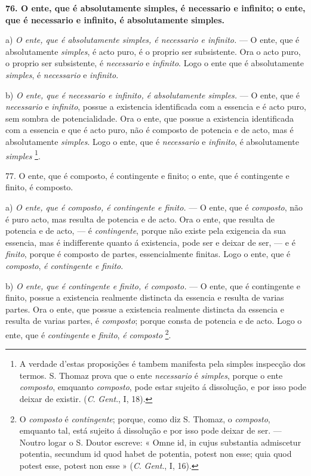 \textbf{76. O ente, que é absolutamente simples, é necessario e infinito; o ente, que é necessario e infinito, é absolutamente simples.}

a) \emph{O ente, que é absolutamente simples, é necessario e infinito.} --- O ente, que é absolutamente \emph{simples}, é acto puro, é o proprio ser subsistente. Ora o acto puro, o proprio ser subsistente, é \emph{necessario} e \emph{infinito}. Logo o ente que é absolutamente \emph{simples}, é \emph{necessario} e \emph{infinito}.

b) \emph{O ente, que é necessario e infinito, é absolutamente simples.} --- O ente, que é \emph{necessario} e \emph{infinito}, possue a existencia identificada com a essencia e é acto puro, sem sombra de potencialidade. Ora o ente, que possue a existencia identificada com a essencia e que é acto puro, não é composto de potencia e de acto, mas é absolutamente \emph{simples}. Logo o ente, que é \emph{necessario} e \emph{infinito}, é absolutamente \emph{simples} \footnote{A verdade d'estas proposições é tambem manifesta pela simples inspecção dos termos. S. Thomaz prova que o ente \emph{necessario} é \emph{simples}, porque o ente \emph{composto}, emquanto \emph{composto}, pode estar sujeito á dissolução, e por isso pode deixar de existir. (\emph{C}. \emph{Gent}., I, 18).}.

77. O ente, que é composto, é contingente e finito; o ente, que é contingente e finito, é composto.

a) \emph{O ente, que é composto, é contingente e finito.} --- O ente, que é \emph{composto}, não é puro acto, mas resulta de potencia e de acto. Ora o ente, que resulta de potencia e de acto, --- é \emph{contingente}, porque não existe pela exigencia da sua essencia, mas é indifferente quanto á existencia, pode ser e deixar de ser, --- e é \emph{finito}, porque é composto de partes, essencialmente finitas. Logo o ente, que é \emph{composto}, \emph{é contingente e finito}.

b) \emph{O ente, que é contingente e finito, é composto.} --- O ente, que é contingente e finito, possue a existencia realmente distincta da essencia e resulta de varias partes. Ora o ente, que possue a existencia realmente distincta da essencia e resulta de varias partes, é \emph{composto}; porque consta de potencia e de acto. Logo o ente, que é \emph{contingente} e \emph{finito}, \emph{é composto} \footnote{O \emph{composto} é \emph{contingente}; porque, como diz S. Thomaz, o \emph{composto}, emquanto tal, está sujeito á dissolução e por isso pode deixar de ser. --- Noutro logar o S. Doutor escreve: « Omne id, in cujus substantia admiscetur potentia, secundum id quod habet de potentia, potest non esse; quia quod potest esse, potest non esse » (\emph{C}. \emph{Gent}., I, 16).}.

